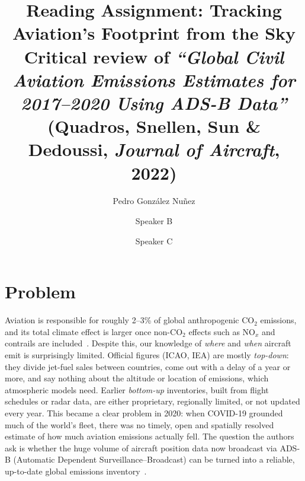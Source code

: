 \documentclass[11pt,a4paper]{article}
\title{\vspace{-1.5cm}\large\textbf{Reading Assignment: Tracking Aviation's Footprint from the Sky}\\[2pt]
\normalsize Critical review of \emph{``Global Civil Aviation Emissions Estimates for 2017--2020 Using ADS-B Data''}\\
(Quadros, Snellen, Sun \& Dedoussi, \emph{Journal of Aircraft}, 2022)}
\author{Pedro Gonz\'alez Nu\~nez \and Speaker B \and Speaker C}
\date{}
\begin{document}
\maketitle
\vspace{-1.2cm}

\section{Problem}
Aviation is responsible for roughly 2--3\% of global anthropogenic CO$_2$ emissions, and its total
climate effect is larger once non-CO$_2$ effects such as NO$_x$ and contrails are included~\cite{lee2021}.
Despite this, our knowledge of \emph{where} and \emph{when} aircraft emit is surprisingly limited.
Official figures (ICAO, IEA) are mostly \emph{top-down}: they divide jet-fuel sales between countries,
come out with a delay of a year or more, and say nothing about the altitude or location of emissions,
which atmospheric models need. Earlier \emph{bottom-up} inventories, built from flight schedules or
radar data, are either proprietary, regionally limited, or not updated every year. This became a clear
problem in 2020: when COVID-19 grounded much of the world's fleet, there was no timely, open and
spatially resolved estimate of how much aviation emissions actually fell. The question the authors ask
is whether the huge volume of aircraft position data now broadcast via ADS-B (Automatic Dependent
Surveillance--Broadcast) can be turned into a reliable, up-to-date global emissions inventory~\cite{quadros2022}.
\end{document}
